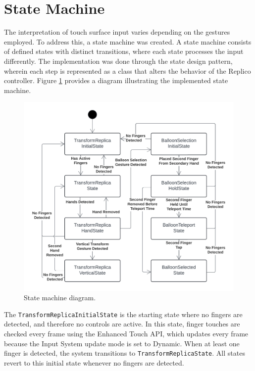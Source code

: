 \section{State Machine}

    The interpretation of touch surface input varies depending on the gestures employed. To address this, a state machine was created. A state machine consists of defined states with distinct transitions, where each state processes the input differently. The implementation was done through the state design pattern, wherein each step is represented as a class that alters the behavior of the Replico controller. Figure \ref{fig:states} provides a diagram illustrating the implemented state machine.

    \begin{figure}[h]
        \centering
        \includegraphics[width=1\linewidth]{figures/states.png}
        \caption{State machine diagram.}
        \label{fig:states}
    \end{figure}

    The \lstinline{TransformReplicaInitialState} is the starting state where no fingers are detected, and therefore no controls are active. In this state, finger touches are checked every frame using the Enhanced Touch API, which updates every frame because the Input System update mode is set to Dynamic. When at least one finger is detected, the system transitions to \lstinline{TransformReplicaState}. All states revert to this initial state whenever no fingers are detected.
    
